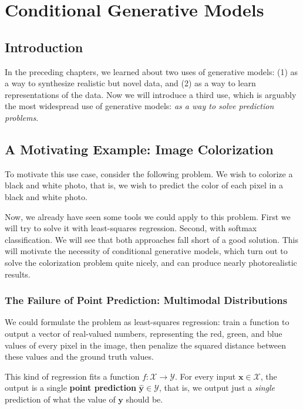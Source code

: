 \chapter{Conditional Generative Models}\label{chapter:conditional_generative_models}


\section{Introduction}

In the preceding chapters, we learned about two uses of generative models: (1) as a way to synthesize realistic but novel data, and (2) as a way to learn representations of the data. Now we will introduce a third use, which is arguably the most widespread use of generative models: \textit{as a way to solve prediction problems}.

\section{A Motivating Example: Image Colorization}

To motivate this use case, consider the following problem. We wish to colorize a black and white photo, that is, we wish to predict the color of each pixel in a black and white photo.

Now, we already have seen some tools we could apply to this problem. First we will try to solve it with least-squares regression. Second, with softmax classification. We will see that both approaches fall short of a good solution. This will motivate the necessity of conditional generative models, which turn out to solve the colorization problem quite nicely, and can produce nearly photorealistic results.

\subsection{The Failure of Point Prediction: Multimodal Distributions}

We could formulate the problem as least-squares regression: train a function to output a vector of real-valued numbers, representing the red, green, and blue values of every pixel in the image, then penalize the squared distance between these values and the ground truth values.

This kind of regression fits a function $f: \mathcal{X} \rightarrow \mathcal{Y}$. For every input $\mathbf{x} \in \mathcal{X}$, the output is a single \textbf{point prediction} $\hat{\mathbf{y}} \in \mathcal{Y}$, that is, we output just a \textit{single} prediction of what the value of $\mathbf{y}$ should be.

